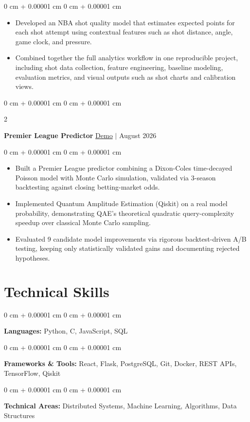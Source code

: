 \documentclass[10pt, letterpaper]{article}
\newenvironment{highlights}{
    \begin{itemize}[
        topsep=0.06 cm,
        parsep=0.06 cm,
        partopsep=0pt,
        itemsep=0pt,
        leftmargin=0 cm + 10pt
    ]
}{
    \end{itemize}
}
\newenvironment{onecolentry}{
    \begin{adjustwidth}{
        0 cm + 0.00001 cm
    }{
        0 cm + 0.00001 cm
    }
}{
    \end{adjustwidth}
}
\newenvironment{twocolentry}[2][]{
    \onecolentry
    \def\secondColumn{#2}
    \setcolumnwidth{\fill, 4.5 cm}
    \begin{paracol}{2}
}{
    \switchcolumn \raggedleft \secondColumn
    \end{paracol}
    \endonecolentry
}
\begin{document}
\vspace{0.06 cm}
\begin{onecolentry}
    \begin{highlights}
        \item Developed an NBA shot quality model that estimates expected points for each shot attempt using contextual features such as shot distance, angle, game clock, and pressure.
        \item Combined together the full analytics workflow in one reproducible project, including shot data collection, feature engineering, baseline modeling, evaluation metrics, and visual outputs such as shot charts and calibration views.
    \end{highlights}
\end{onecolentry}

\begin{twocolentry}{
    \href{https://amin9666.github.io/Premier_League_Prediction_26/}{Demo} $|$ August 2026
}
    \textbf{Premier League Predictor}\end{twocolentry}

\vspace{0.06 cm}
\begin{onecolentry}
    \begin{highlights}
        \item Built a Premier League predictor combining a Dixon-Coles time-decayed Poisson model with Monte Carlo simulation, validated via 3-season backtesting against closing betting-market odds.
        \item Implemented Quantum Amplitude Estimation (Qiskit) on a real model probability, demonstrating QAE's theoretical quadratic query-complexity speedup over classical Monte Carlo sampling.
        \item Evaluated 9 candidate model improvements via rigorous backtest-driven A/B testing, keeping only statistically validated gains and documenting rejected hypotheses.
    \end{highlights}
\end{onecolentry}

\section{Technical Skills}

\begin{onecolentry}
    \textbf{Languages:} Python, C, JavaScript, SQL
\end{onecolentry}

\vspace{0.14 cm}

\begin{onecolentry}
    \textbf{Frameworks \& Tools:} React, Flask, PostgreSQL, Git, Docker, REST APIs, TensorFlow, Qiskit
\end{onecolentry}

\vspace{0.14 cm}

\begin{onecolentry}
    \textbf{Technical Areas:} Distributed Systems, Machine Learning, Algorithms, Data Structures
\end{onecolentry}
\end{document}
